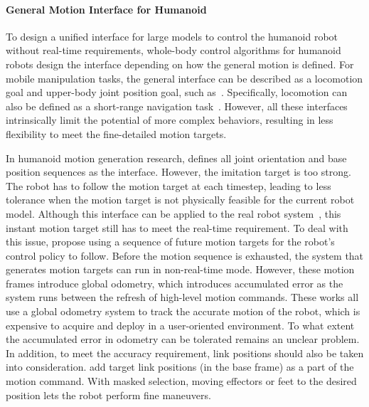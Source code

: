 \paragraph{General Motion Interface for Humanoid}
To design a unified interface for large models to control the humanoid robot without real-time requirements, whole-body control algorithms for humanoid robots design the interface depending on how the general motion is defined. For mobile manipulation tasks, the general interface can be described as a locomotion goal and upper-body joint position goal, such as~\cite{zhuang2023robot, zhuang2024humanoid, cheng2024express}. Specifically, locomotion can also be defined as a short-range navigation task~\cite{lee2020learning, yang2021real, miki2024learning}. However, all these interfaces intrinsically limit the potential of more complex behaviors, resulting in less flexibility to meet the fine-detailed motion targets.

In humanoid motion generation research, \citet{peng2018deepMimic, tessler2023calm, Luo2023PerpetualHC} defines all joint orientation and base position sequences as the interface. However, the imitation target is too strong. The robot has to follow the motion target at each timestep, leading to less tolerance when the motion target is not physically feasible for the current robot model. Although this interface can be applied to the real robot system~\cite{he2024learning, fu2024humanplus, he2024omnih2o}, this instant motion target still has to meet the real-time requirement. To deal with this issue, \citet{zargarbashi2024robotkeyframing, tessler2024maskedmimic, zhang2024wococo} propose using a sequence of future motion targets for the robot's control policy to follow. Before the motion sequence is exhausted, the system that generates motion targets can run in non-real-time mode. However, these motion frames introduce global odometry, which introduces accumulated error as the system runs between the refresh of high-level motion commands. These works all use a global odometry system to track the accurate motion of the robot, which is expensive to acquire and deploy in a user-oriented environment. To what extent the accumulated error in odometry can be tolerated remains an unclear problem. In addition, to meet the accuracy requirement, link positions should also be taken into consideration. \citet{liu2024rdt, he2024learning, he2024omnih2o} add target link positions (in the base frame) as a part of the motion command. With masked selection, moving effectors or feet to the desired position lets the robot perform fine maneuvers. 

